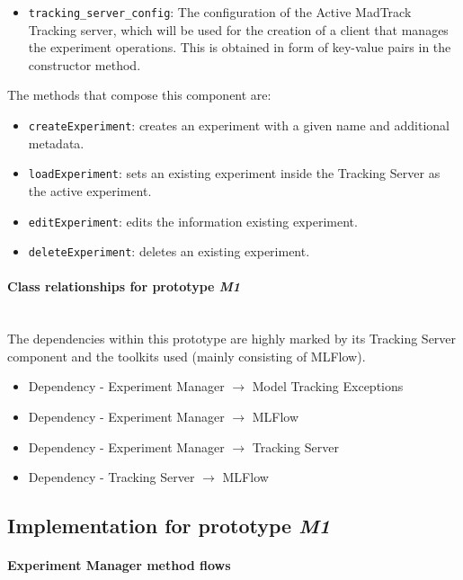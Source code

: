 \begin{itemize}
    \item \texttt{tracking\_server\_config}: The configuration of the Active MadTrack Tracking server, which will be used for the creation of a client 
    that manages the experiment operations. This is obtained in form of key-value pairs in the constructor method.
\end{itemize}

The methods that compose this component are:

\begin{itemize}
    \item \texttt{createExperiment}: creates an experiment with a given name and additional metadata.
    \item \texttt{loadExperiment}: sets an existing experiment inside the Tracking Server as the active experiment.
    \item \texttt{editExperiment}: edits the information existing experiment.
    \item \texttt{deleteExperiment}: deletes an existing experiment.
\end{itemize}

\paragraph{Class relationships for prototype \emph{M1}} \mbox{}\\

The dependencies within this prototype are highly marked by its Tracking Server component and the toolkits used (mainly consisting of MLFlow).

\begin{itemize}
    \item Dependency - Experiment Manager $\rightarrow$ Model Tracking Exceptions
    \item Dependency - Experiment Manager $\rightarrow$ MLFlow
    \item Dependency - Experiment Manager $\rightarrow$ Tracking Server
    \item Dependency - Tracking Server $\rightarrow$ MLFlow
\end{itemize}


\subsection{Implementation for prototype \emph{M1}}

\paragraph{Experiment Manager method flows} \mbox{}\\


